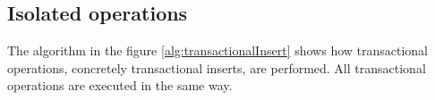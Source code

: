 \subsection{Isolated operations}
The algorithm in the figure \ref{alg:transactionalInsert} shows how transactional operations, concretely transactional inserts, are performed. All transactional operations are executed in the same way. 

    


